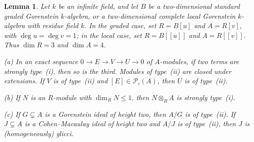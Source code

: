 \documentclass[11pt,letterpaper]{amsart}
\theoremstyle{plain}
\newtheorem{lem}[thm]{Lemma}
\theoremstyle{definition}
\theoremstyle{remark}
\begin{document}
\begin{lem}\label{lem:type-calculus}
Let $k$ be an infinite field, and let $B$ be a two-dimensional standard graded Gorenstein $k$-algebra, or a two-dimensional complete local Gorenstein $k$-algebra with residue field $k$. In the graded case, set $R=B[u]$ and $A=R[v]$, with $\deg u=\deg v=1$; in the local case, set $R=B[[u]]$ and $A=R[[v]]$. Thus $\dim R=3$ and $\dim A=4$. 

\par\smallskip\noindent\textup{(a)} In an exact sequence $0\to E\to V\to U\to0$ of $A$-modules, if two terms are strongly type~(i), then so is the third. Modules of type~(ii) are closed under extensions. If $V$ is of type~(ii) and $[E]\in\mathcal P_i(A)$, then $U$ is of type~(ii).%

\par\smallskip\noindent\textup{(b)} If $N$ is an $R$-module with $\dim_R N\leq1$, then $N\otimes_R A$ is strongly type~(i).

\par\smallskip\noindent\textup{(c)} If $G\subsetneq A$ is a Gorenstein ideal of height two, then $A/G$ is of type~(ii). If $J\subsetneq A$ is a Cohen--Macaulay ideal of height two and $A/J$ is of type~(ii), then $J$ is (homogeneously) glicci.
\end{lem}
\end{document}
